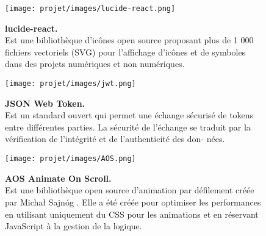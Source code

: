 \begin{figure}[H]
    \centering
    \begin{minipage}[c]{0.3\textwidth}
        \texttt{[image: projet/images/lucide-react.png]}
    \end{minipage}
    \hspace{1cm}
    \begin{minipage}[c]{0.6\textwidth}
        \textbf{lucide-react.}\\[0.5em]
    Est  une bibliothèque d'icônes open source proposant plus de 1 000 fichiers vectoriels (SVG) pour l'affichage d'icônes et de symboles dans des projets numériques et non numériques. \cite{ref22}
    \end{minipage}
\end{figure}
\vspace{0.5cm}
\begin{figure}[H]
    \centering
    \begin{minipage}[c]{0.3\textwidth}
        \texttt{[image: projet/images/jwt.png]}
    \end{minipage}
    \hspace{1cm}
    \begin{minipage}[c]{0.6\textwidth}
        \textbf{JSON Web Token.}\\[0.5em]
    Est un standard ouvert qui permet une échange sécurisé de tokens entre différentes parties. La sécurité de l’échange
se traduit par la vérification de l’intégrité et de l’authenticité des don-
nées. \cite{ref23}
    \end{minipage}
\end{figure}
\vspace{0.5cm}
\begin{figure}[H]
    \centering
    \begin{minipage}[c]{0.3\textwidth}
        \texttt{[image: projet/images/AOS.png]}
    \end{minipage}
    \hspace{1cm}
    \begin{minipage}[c]{0.6\textwidth}
        \textbf{AOS Animate On Scroll.}\\[0.5em]
    Est une bibliothèque open source d'animation par défilement créée par Michał Sajnóg . Elle a été créée pour optimiser les performances en utilisant uniquement du CSS pour les animations et en réservant JavaScript à la gestion de la logique. \cite{ref25}
    \end{minipage}
\end{figure}
